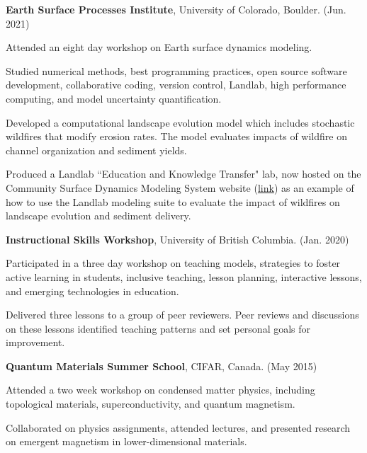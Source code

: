 \documentclass[11pt,letterpaper]{article}
\renewenvironment{itemize}{
	\begin{list}{}{
			\setlength{\leftmargin}{1.5em}
			\setlength{\rightmargin}{0em}  %
			\setlength{\itemsep}{0.25em}
			\setlength{\parskip}{0pt}
			\setlength{\parsep}{0.25em}
		}
	}{
	\end{list}
}
\newenvironment{itemizeit}
{\itemize\let\origitem\item
	\renewcommand{\item}[1][default]
	{\origitem[\tiny $\blacksquare$]}}
{\enditemize}
\renewenvironment{itemize}{
	\begin{list}{}{
			\setlength{\leftmargin}{1.5em}
			\setlength{\itemsep}{0.25em}
			\setlength{\parskip}{0pt}
			\setlength{\parsep}{0.25em}
		}
	}{
	\end{list}
}
\begin{document}
\begin{itemize}
\item {\bf Earth Surface Processes Institute}, University of Colorado, Boulder. \hfill (Jun. 2021)

	\begin{itemizeit} 
		\item Attended an eight day workshop on Earth surface dynamics modeling.
		\item Studied numerical methods, best programming practices, open source software development, collaborative coding, version control, Landlab, high performance computing, and model uncertainty quantification.
		\item Developed a computational landscape evolution model which includes stochastic wildfires that modify erosion rates. The model evaluates impacts of wildfire on channel organization and sediment yields.
		\item Produced a Landlab ``Education and Knowledge Transfer" lab, now hosted on the Community Surface Dynamics Modeling System website (\href{https://csdms.colorado.edu/wiki/Lab-0024}{link}) as an example of how to use the Landlab modeling suite to evaluate the impact of wildfires on landscape evolution and sediment delivery.
	\end{itemizeit}

\item {\bf Instructional Skills Workshop}, University of British Columbia. \hfill (Jan. 2020)

	\begin{itemizeit} 
		\item Participated in a three day workshop on teaching models, strategies to foster active learning in students, inclusive teaching, lesson planning, interactive lessons, and emerging technologies in education.
		\item Delivered three lessons to a group of peer reviewers. Peer reviews and discussions on these lessons identified teaching patterns and set personal goals for improvement.
	\end{itemizeit}

\item {\bf Quantum Materials Summer School}, CIFAR, Canada. \hfill (May 2015)%

	\begin{itemizeit}
		\item Attended a two week workshop on condensed matter physics, including topological materials, superconductivity, and quantum magnetism.
		\item Collaborated on physics assignments, attended lectures, and presented research on emergent magnetism in lower-dimensional materials.
	\end{itemizeit}
\end{itemize}
\end{document}
